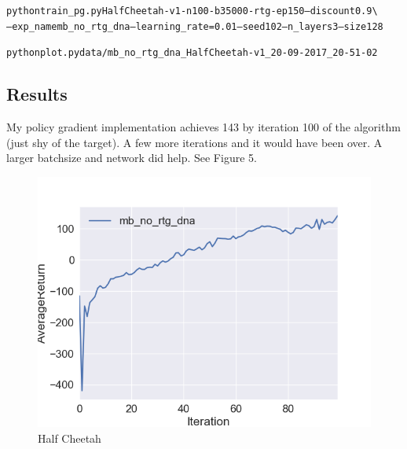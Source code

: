 \documentclass{article}\usepackage[]{graphicx}\usepackage[]{color}
\makeatletter
\newenvironment{kframe}{%
 \def\at@end@of@kframe{}%
 \ifinner\ifhmode%
  \def\at@end@of@kframe{\end{minipage}}%
  \begin{minipage}{\columnwidth}%
 \fi\fi%
 \def\FrameCommand##1{\hskip\@totalleftmargin \hskip-\fboxsep
 \colorbox{shadecolor}{##1}\hskip-\fboxsep
     \hskip-\linewidth \hskip-\@totalleftmargin \hskip\columnwidth}%
 \MakeFramed {\advance\hsize-\width
   \@totalleftmargin\z@ \linewidth\hsize
   \@setminipage}}%
 {\par\unskip\endMakeFramed%
 \at@end@of@kframe}
\newenvironment{knitrout}{}{} %
\makeatother
\begin{document}
\begin{knitrout}
\color{fgcolor}\begin{kframe}
\begin{alltt}

python train_pg.py HalfCheetah-v1 -n 100 -b 35000 -rtg -ep 150 --discount 0.9 \textbackslash{}
--exp_name mb_no_rtg_dna --learning_rate=0.01 --seed 102 --n_layers 3 --size 128

python plot.py data/mb_no_rtg_dna_HalfCheetah-v1_20-09-2017_20-51-02


\end{alltt}
\end{kframe}
\end{knitrout}


\subsection*{Results}

My policy gradient implementation achieves 143 by iteration 100 of the algorithm (just shy of the target). A few more iterations and it would have been over. A larger batchsize and network did help. See Figure 5.


\begin{figure}
  \includegraphics[width=\linewidth]{figures/cheetah_6.png}
  \caption{Half Cheetah}
  \label{cheetah}
\end{figure}
\end{document}
